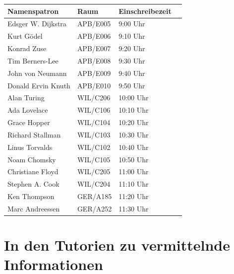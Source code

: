 \documentclass[a4paper,12pt]{report}
\begin{document}
\begin{center}
\vspace{1cm}
\begin{tabular}[h]{|l|l|l|l|}
	\hline
	\textbf{Namenspatron} & \textbf{Raum}& \textbf{Einschreibezeit}\\ \hline
	Edsger W. Dijkstra & APB/E005 & 9:00 Uhr\\
	Kurt Gödel & APB/E006 & 9:10 Uhr\\
	Konrad Zuse & APB/E007 & 9:20 Uhr\\
	Tim Berners-Lee & APB/E008 & 9:30 Uhr\\
	John von Neumann & APB/E009 & 9:40 Uhr\\
	Donald Ervin Knuth & APB/E010 & 9:50 Uhr\\
	Alan Turing & WIL/C206 & 10:00 Uhr\\
	Ada Lovelace & WIL/C106 & 10:10 Uhr\\
	Grace Hopper & WIL/C104 & 10:20 Uhr\\
	Richard Stallman & WIL/C103 & 10:30 Uhr\\
	Linus Torvalds & WIL/C102 & 10:40 Uhr\\
	Noam Chomsky & WIL/C105 & 10:50 Uhr\\
	Christiane Floyd & WIL/C205 & 11:00 Uhr\\
	Stephen A. Cook & WIL/C204 & 11:10 Uhr\\
	Ken Thompson & GER/A185 & 11:20 Uhr\\
	Marc Andreessen & GER/A252 & 11:30 Uhr\\
	\hline
\end{tabular}
\end{center}

\chapter{In den Tutorien zu vermittelnde Informationen}
\end{document}
